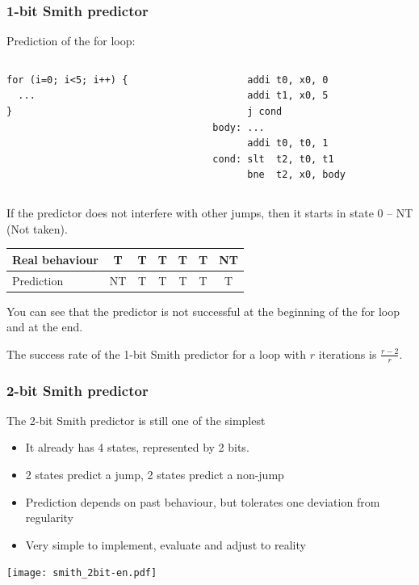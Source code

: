 \documentclass{beamer}
\begin{document}
\begin{frame}[fragile]
\frametitle{1-bit Smith predictor}

Prediction of the for loop:

\begin{columns}[T]
\begin{column}{0.35\textwidth}
\begin{verbatim}
for (i=0; i<5; i++) {
  ...
}
\end{verbatim}
\end{column}
\hfill
\begin{column}{0.45\textwidth}
\begin{verbatim}
      addi t0, x0, 0
      addi t1, x0, 5
      j cond
body: ...
      addi t0, t0, 1
cond: slt  t2, t0, t1
      bne  t2, x0, body
\end{verbatim}
\end{column}
\end{columns}
\bigskip
If the predictor does not interfere with other jumps, then it starts in state 0 -- NT (Not taken).

\begin{tabular}{|l|c|c|c|c|c|c|}\hline
Real behaviour & T & T & T & T & T & NT\\\hline
Prediction & {\color{red}NT} & T & T & T & T & {\color{red}T}\\\hline
\end{tabular}

You can see that the predictor is not successful at the beginning of the for loop and at the end.

The success rate of the 1-bit Smith predictor for a loop with $r$ iterations is $\frac{r-2}{r}$.
\end{frame}


\begin{frame}
\frametitle{2-bit Smith predictor}

The 2-bit Smith predictor is still one of the simplest
\begin{itemize}
\item It already has 4 states, represented by 2 bits.
\item 2 states predict a jump, 2 states predict a non-jump
\item Prediction depends on past behaviour, but tolerates one deviation from regularity
\item Very simple to implement, evaluate and adjust to reality
\end{itemize}

\begin{center}
\texttt{[image: smith\_2bit-en.pdf]}
\end{center}
\end{frame}
\end{document}
